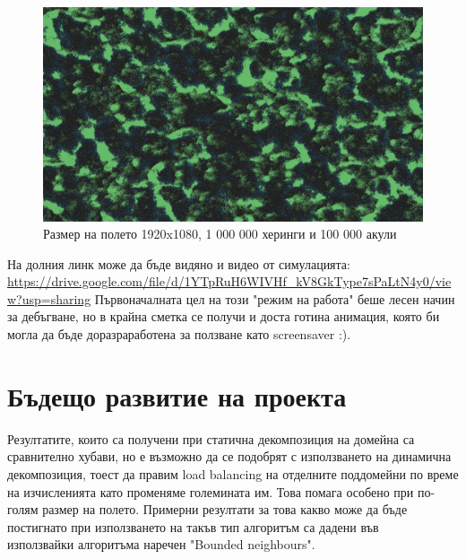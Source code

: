 \documentclass[12pt]{article}
\begin{document}
\begin{figure}[H]
	\centering
	\includegraphics[width=1\textwidth]{screenshot-big.png}
	\caption{Размер на полето 1920x1080, 1 000 000 херинги и 100 000 акули}
\end{figure}

На долния линк може да бъде видяно и видео от симулацията: \\
\url{https://drive.google.com/file/d/1YTpRuH6WIVHf_kV8GkType7sPaLtN4y0/view?usp=sharing}
\bigbreak
Първоначалната цел на този "режим на работа" беше лесен начин за дебъгване,
но в крайна сметка се получи и доста готина анимация, която би могла да бъде доразраработена за ползване като screensaver :).

\section{Бъдещо развитие на проекта}
Резултатите, които са получени при статична декомпозиция на домейна са сравнително хубави,
но е възможно да се подобрят с използването на динамична декомпозиция, тоест да правим
load balancing на отделните поддомейни по време на изчисленията като променяме големината им. Това помага особено при
по-голям размер на полето. Примерни резултати за това какво може да бъде постигнато при
използването на такъв тип алгоритъм са дадени във ~\cite{bounded_neighbours} използвайки алгоритъма наречен "Bounded neighbours".
{}

\end{document}
